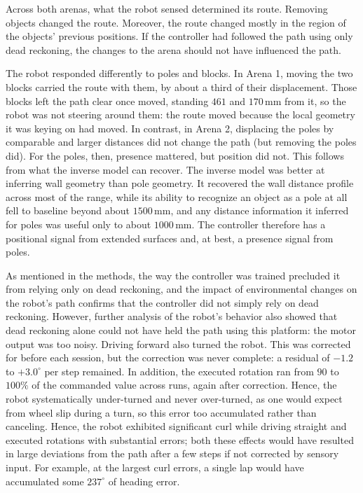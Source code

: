 \documentclass[11pt]{article}
\begin{document}
Across both arenas, what the robot sensed determined its route. Removing objects changed the route. Moreover, the route changed mostly in the region of the objects' previous positions. If the controller had followed the path using only dead reckoning, the changes to the arena should not have influenced the path.

The robot responded differently to poles and blocks. In Arena 1, moving the two blocks carried the route with them, by about a third of their displacement. Those blocks left the path clear once moved, standing $461$ and $170$\,mm from it, so the robot was not steering around them: the route moved because the local geometry it was keying on had moved. In contrast, in Arena 2, displacing the poles by comparable and larger distances did not change the path (but removing the poles did). For the poles, then, presence mattered, but position did not. This follows from what the inverse model can recover. The inverse model was better at inferring wall geometry than pole geometry. It recovered the wall distance profile across most of the range, while its ability to recognize an object as a pole at all fell to baseline beyond about $1500$\,mm, and any distance information it inferred for poles was useful only to about $1000$\,mm. The controller therefore has a positional signal from extended surfaces and, at best, a presence signal from poles.

As mentioned in the methods, the way the controller was trained precluded it from relying only on dead reckoning, and the impact of environmental changes on the robot's path confirms that the controller did not simply rely on dead reckoning. However, further analysis of the robot’s behavior also showed that dead reckoning alone could not have held the path using this platform: the motor output was too noisy. Driving forward also turned the robot. This was corrected for before each session, but the correction was never complete: a residual of $-1.2$ to $+3.0^{\circ}$ per step remained. In addition, the executed rotation ran from $90$ to $100\%$ of the commanded value across runs, again after correction. Hence, the robot systematically under-turned and never over-turned, as one would expect from wheel slip during a turn, so this error too accumulated rather than canceling. Hence, the robot exhibited significant curl while driving straight and executed rotations with substantial errors; both these effects would have resulted in large deviations from the path after a few steps if not corrected by sensory input. For example, at the largest curl errors, a single lap would have accumulated some $237^{\circ}$ of heading error.
\end{document}
